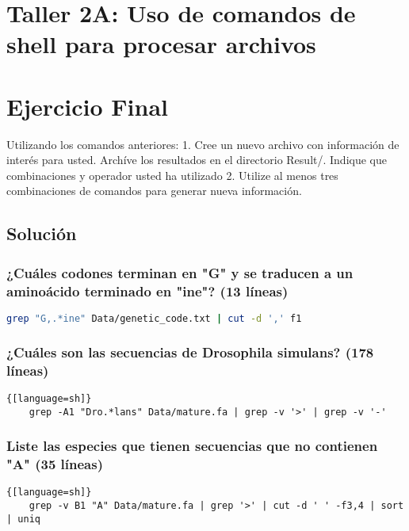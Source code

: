 \documentclass[10pt]{article}
\author{Diego Esteban Quintero Rey}
\begin{document}
\section{Taller 2A: Uso de comandos de shell para procesar archivos}

\section{Ejercicio Final}

Utilizando los comandos anteriores:
1. Cree un nuevo archivo con información de interés para usted. Archíve los resultados  en el directorio Result/. Indique que combinaciones y operador usted ha utilizado
2. Utilize al menos tres combinaciones de comandos para generar nueva información.

\subsection*{Solución}

\subsubsection*{¿Cuáles codones terminan en "G" y se traducen a un aminoácido terminado en "ine"? (13 líneas)}

\begin{lstlisting}[language=sh]
    grep "G,.*ine" Data/genetic_code.txt | cut -d ',' f1
\end{lstlisting}

\subsubsection*{¿Cuáles son las secuencias de Drosophila simulans? (178 líneas)}

\begin{lstlisting}{[language=sh]}
    grep -A1 "Dro.*lans" Data/mature.fa | grep -v '>' | grep -v '-' 
\end{lstlisting}

\subsubsection*{Liste las especies que tienen secuencias que no contienen "A" (35 líneas)}

\begin{lstlisting}{[language=sh]}
    grep -v B1 "A" Data/mature.fa | grep '>' | cut -d ' ' -f3,4 | sort | uniq
\end{lstlisting}
\end{document}
